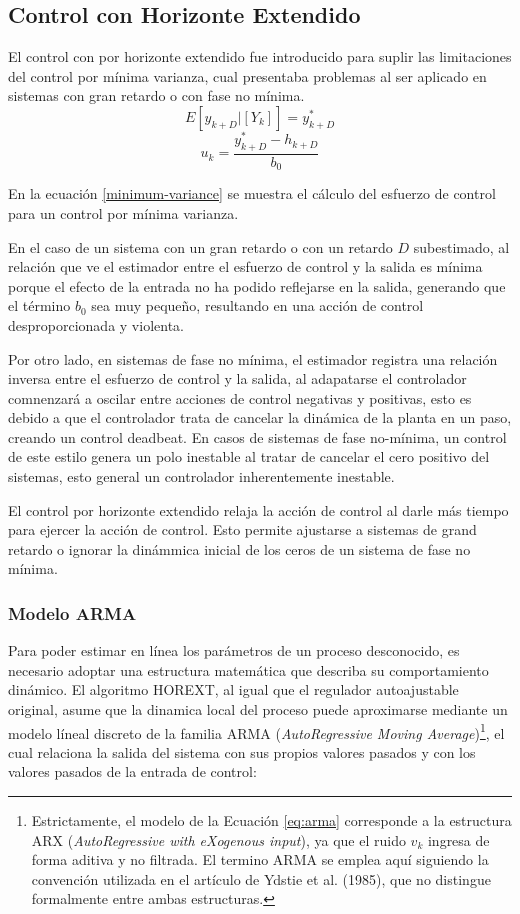 \subsection{Control con Horizonte Extendido}
El control con por horizonte extendido fue introducido para suplir las limitaciones del control por mínima varianza, cual presentaba problemas al ser aplicado en sistemas con gran retardo o con fase no mínima.
\[
  E[y_{k+D}|[Y_k]] = y^*_{k+D}
\]
\begin{equation}
  u_k = \frac{y^*_{k+D}-h_{k+D}}{b_0}
  \label{minimum-variance}
\end{equation}

En la ecuación \ref{minimum-variance} se muestra el cálculo del esfuerzo de control para un control por mínima varianza. 

En el caso de un sistema con un gran retardo o con un retardo $D$ subestimado, al relación que ve el estimador entre el esfuerzo de control y la salida es mínima porque el efecto de la entrada no ha podido reflejarse en la salida, generando que el término $b_0$ sea muy pequeño, resultando en una acción de control desproporcionada y violenta. 

Por otro lado, en sistemas de fase no mínima, el estimador registra una relación inversa entre el esfuerzo de control y la salida, al adapatarse el controlador comnenzará a oscilar entre acciones de control negativas y positivas, esto es debido a que el controlador trata de cancelar la dinámica de la planta en un paso, creando un control deadbeat. En casos de sistemas de fase no-mínima, un control de este estilo genera un polo inestable al tratar de cancelar el cero positivo del sistemas, esto general un controlador inherentemente inestable.


El control por horizonte extendido relaja la acción de control al darle más tiempo para ejercer la acción de control. Esto permite ajustarse a sistemas de grand retardo o ignorar la dinámmica inicial de los ceros de un sistema de fase no mínima.

\subsubsection{Modelo ARMA}

Para poder estimar en línea los parámetros de un proceso desconocido, es necesario adoptar una estructura matemática que describa su comportamiento dinámico. El algoritmo HOREXT, al igual que el regulador autoajustable original, asume que la dinamica local del proceso puede aproximarse mediante un modelo líneal discreto de
la familia ARMA (\textit{AutoRegressive Moving Average})\footnote{Estrictamente, el modelo de la Ecuación \ref{eq:arma} corresponde a la estructura ARX (\textit{AutoRegressive with eXogenous input}), ya que el ruido $v_k$ ingresa de forma aditiva y no filtrada. El termino ARMA se emplea aquí siguiendo la convención utilizada en el artículo de Ydstie et al. (1985), que no distingue formalmente entre ambas estructuras.}, el cual relaciona la salida del sistema con sus propios valores pasados y con los valores pasados de la entrada de control:

